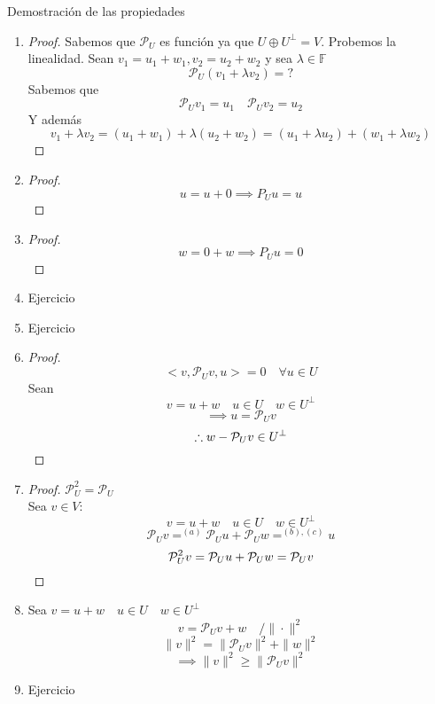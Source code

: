 \documentclass[11pt]{book}
\newcommand{\set}[1]{\mathbb{#1}}
\theoremstyle{definition}
\begin{document}
Demostración de las propiedades
\begin{enumerate}[label=\textbf{(\alph*)}]
	\item \begin{proof}
		      Sabemos que $\mathcal{P}_U$ es función ya que $U\oplus U^\perp=V$. Probemos la linealidad. Sean $v_1=u_1+w_1,v_2=u_2+w_2$ y sea $\lambda\in\set{F}$
		      \[\mathcal{P}_U(v_1+\lambda v_2)=?\]
		      Sabemos que
		      \[\mathcal{P}_Uv_1=u_1\quad\mathcal{P}_Uv_2=u_2\]
		      Y además
		      \[v_1+\lambda v_2=(u_1+w_1)+\lambda (u_2+w_2)=(u_1+\lambda u_2)+(w_1+\lambda w_2)\]
	      \end{proof}

	\item \begin{proof}
		      \[u=u+0\implies P_Uu=u\]
	      \end{proof}

	\item \begin{proof}
		      \[w=0+w\implies P_Uu=0\]
	      \end{proof}

	\item Ejercicio

	\item Ejercicio

	\item \begin{proof}
		      \[<v,\mathcal{P}_Uv,u>=0\quad\forall u\in U\]
		      Sean
		      \[v=u+w\quad u\in U\quad w\in U^\perp\]
		      \[\implies u=\mathcal{P}_Uv\]
		      \[\therefore w-\mathcal{P}_Uv\in U^\perp\qedhere\]
	      \end{proof}

	\item \begin{proof}
		      $\mathcal{P}_U^2=\mathcal{P}_U$\\
		      Sea $v\in V$:
		      \[v=u+w\quad u \in U\quad w\in U^\perp\]
		      \[\mathcal{P}_Uv=^{(a)}\mathcal{P}_Uu+\mathcal{P}_Uw=^{(b),(c)}u\]
		      \[\mathcal{P}_U^2v=\mathcal{P}_Uu+\mathcal{P}_Uw=\mathcal{P}_Uv\qedhere\]
	      \end{proof}

	\item Sea $v=u+w\quad u\in U\quad w\in U^\perp$
	      \[v=\mathcal{P}_Uv+w\quad/\|\cdot\|^2\]
	      \[\|v\|^2=\|\mathcal{P}_Uv\|^2+\|w\|^2\]
	      \[\implies \|v\|^2\geq \|\mathcal{P}_Uv\|^2\]

	\item Ejercicio
\end{enumerate}
\end{document}
